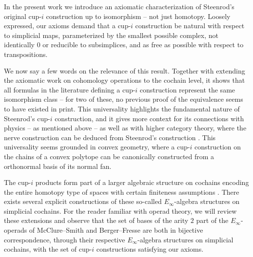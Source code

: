 In the present work we introduce an axiomatic characterization of Steenrod's original cup-$i$ construction up to isomorphism -- not just homotopy.
Loosely expressed, our axioms demand that a cup-$i$ construction be natural with respect to simplicial maps, parameterized by the smallest possible complex, not identically $0$ or reducible to subsimplices, and as free as possible with respect to transpositions.

We now say a few words on the relevance of this result.
Together with extending the axiomatic work on cohomology operations \cite{serre1053eilenberg_maclane, cartan1955iteration, steenrod1962cohomology} to the cochain level, it shows that all formulas in the literature \cite{steenrod1947products, real1996computability,mcclure2003multivariable,berger2004combinatorial,medina2020prop1,medina2023fast_sq} defining a cup-$i$ construction represent the same isomorphism class -- for two of these, no previous proof of the equivalence seems to have existed in print.
This universality highlights the fundamental nature of Steenrod's \mbox{cup-$i$} construction, and it gives more context for its connections with physics -- as mentioned above -- as well as with higher category theory, where the nerve construction can be deduced from Steenrod's construction \cite{street1987orientals, medina2020globular}.
This universality seems grounded in convex geometry, where a cup-$i$ construction on the chains of a convex polytope can be canonically constructed from a orthonormal basis of its normal fan.

The cup-$i$ products form part of a larger algebraic structure on cochains encoding the entire homotopy type of spaces with certain finiteness assumptions \cite{mandell2006homotopy_type}.
There exists several explicit constructions of these so-called $E_\infty$-algebra structures \cite{mcclure2003multivariable,berger2004combinatorial,medina2020prop1} on simplicial cochains.
For the reader familiar with operad theory, we will review these extensions and observe that the set of bases of the arity $2$ part of the $E_\infty$-operads of McClure--Smith and Berger--Fresse are both in bijective correspondence, through their respective $E_\infty$-algebra structures on simplicial cochains, with the set of cup-$i$ constructions satisfying our axioms.

